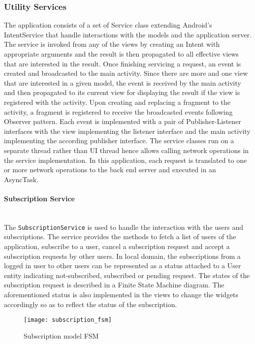 \subsubsection{Utility Services}
The application consists of a set of Service class extending Android's IntentService that handle interactions with the models
and the application server. The service is invoked from any of the views by creating an Intent with appropriate
arguments and the result is then propagated to all effective views that are interested in the result. Once finishing
servicing a request, an event is created and broadcasted to the main activity. Since there are more and one view that
are interested in a given model, the event is received by the main activity and then propagated to its current view for
displaying the result if the view is registered with the activity. Upon creating and replacing a fragment to the
activity, a fragment is registered to receive the broadcasted events following Observer pattern. Each event is
implemented with a pair of Publisher-Listener interfaces with the view implementing the listener interface and the main
activity implementing the according publisher interface.
The service classes run on a separate thread rather than UI thread hence allows calling network operations in the
service implementation. In this application, each request is translated to one or more network operations to the back
end server and executed in an AsyncTask.

\paragraph{Subscription Service} \mbox{} \\
The \texttt{SubscriptionService} is used to handle the interaction with the users and subscriptions. The service provides the
methods to fetch a list of users of the application, subscribe to a user, cancel a subscription request and accept a
subscription requests by other users.  In local domain, the subscriptions from a logged in user to other users can be
represented as a status attached to a User entity indicating not-subscribed, subscribed or pending request. The states
of the subscription request is described in a Finite State Machine diagram. The aforementioned status is also
implemented in the views to change the widgets accordingly so as to reflect the status of the subscription.

\begin{figure}[!ht]
    \caption{Subscription model FSM}
    \centering
    \texttt{[image: subscription\_fsm]}
\end{figure}

